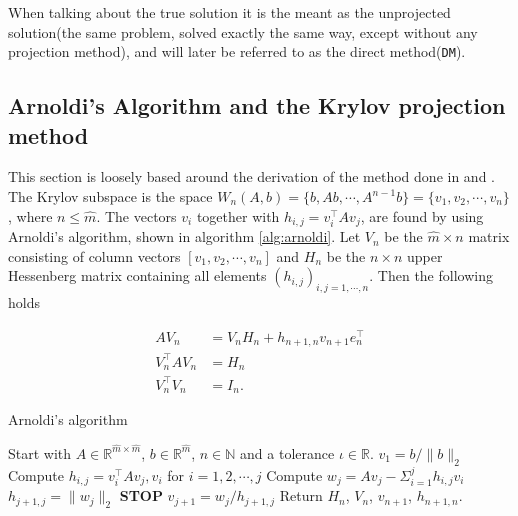When talking about the true solution it is the meant as the unprojected solution(the same problem, solved exactly the same way, except without any projection method), and will later be referred to as the direct method(\texttt{DM}).
\subsection{Arnoldi's Algorithm and the Krylov projection method} %
This section is loosely based around the derivation of the method done in \cite{elena} and \cite{min}. \\

The Krylov subspace is the space $W_n (A,b) = \{b,Ab, \cdots, A^{n-1}b\} = \{v_1,v_2,\cdots,v_n\} $, where $n \leq \hat{m}$.
The vectors $v_i$ together with $h_{i,j} = v_i^\top Av_j$, are found by using Arnoldi's algorithm, shown in algorithm \ref{alg:arnoldi}. Let $V_n$ be the $\hat{m} \times n$ matrix consisting of column vectors $[v_1,v_2,\cdots,v_n ] $ and $H_n$ be the $n \times n$ upper Hessenberg matrix containing all elements $(h_{i,j})_{i,j=1,\cdots,n}$. Then the following holds \cite{kryprop}

\begin{equation}
\begin{aligned}
AV_n & = V_n H_n + h_{n+1,n}v_{n+1}e^\top_n  \\
V^{\top}_n AV_n &= H_n  \\
V_n^{\top} V_n &= I_n. 
\label{eqn:propA}
\end{aligned}
\end{equation}

\begin{algorithm} [h!]
\begin{algorithmic} \caption{Arnoldi's algorithm\cite{arnold}} \label{alg:arnoldi}  
\STATE Start with $A \in \mathbb{R}^{\hat{m} \times \hat{m}}$, $b \in \mathbb{R}^{\hat{m}}$, $n \in \mathbb{N}$ and a tolerance $\iota \in \mathbb{R}$.
\STATE $v_1 = b/\|b \|_2$
   \STATE Compute $h_{i,j} =  v_i^{\top}Av_j,v_i $ for $i = 1,2,\cdots, j$
    \STATE Compute $w_j = A v_j - \Sigma_{i=1}^{j} h_{i,j}v_i $
    \STATE $h_{j+1,j} = \| w_j \|_2$
        \STATE\textbf{STOP}
    \ENDIF 
   \STATE $v_{j+1} = w_j/h_{j+1,j}$
\ENDFOR
\STATE Return $H_n$, $V_n$, $v_{n+1}$, $h_{n+1,n}$.
\end{algorithmic} 
\end{algorithm}



